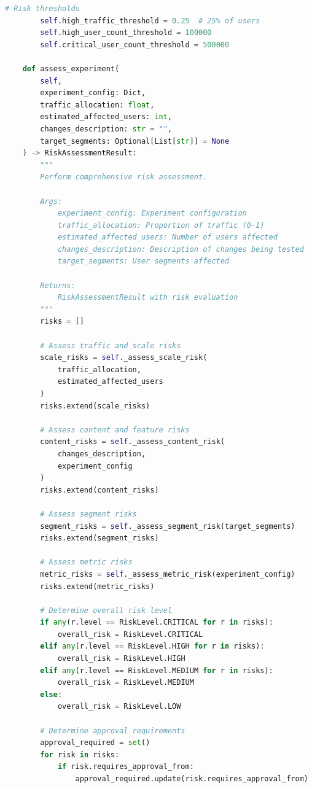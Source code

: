 \begin{lstlisting}[language=Python, caption={Experiment Risk Assessment System}]
        # Risk thresholds
        self.high_traffic_threshold = 0.25  # 25% of users
        self.high_user_count_threshold = 100000
        self.critical_user_count_threshold = 500000

    def assess_experiment(
        self,
        experiment_config: Dict,
        traffic_allocation: float,
        estimated_affected_users: int,
        changes_description: str = "",
        target_segments: Optional[List[str]] = None
    ) -> RiskAssessmentResult:
        """
        Perform comprehensive risk assessment.

        Args:
            experiment_config: Experiment configuration
            traffic_allocation: Proportion of traffic (0-1)
            estimated_affected_users: Number of users affected
            changes_description: Description of changes being tested
            target_segments: User segments affected

        Returns:
            RiskAssessmentResult with risk evaluation
        """
        risks = []

        # Assess traffic and scale risks
        scale_risks = self._assess_scale_risk(
            traffic_allocation,
            estimated_affected_users
        )
        risks.extend(scale_risks)

        # Assess content and feature risks
        content_risks = self._assess_content_risk(
            changes_description,
            experiment_config
        )
        risks.extend(content_risks)

        # Assess segment risks
        segment_risks = self._assess_segment_risk(target_segments)
        risks.extend(segment_risks)

        # Assess metric risks
        metric_risks = self._assess_metric_risk(experiment_config)
        risks.extend(metric_risks)

        # Determine overall risk level
        if any(r.level == RiskLevel.CRITICAL for r in risks):
            overall_risk = RiskLevel.CRITICAL
        elif any(r.level == RiskLevel.HIGH for r in risks):
            overall_risk = RiskLevel.HIGH
        elif any(r.level == RiskLevel.MEDIUM for r in risks):
            overall_risk = RiskLevel.MEDIUM
        else:
            overall_risk = RiskLevel.LOW

        # Determine approval requirements
        approval_required = set()
        for risk in risks:
            if risk.requires_approval_from:
                approval_required.update(risk.requires_approval_from)


\end{lstlisting}
